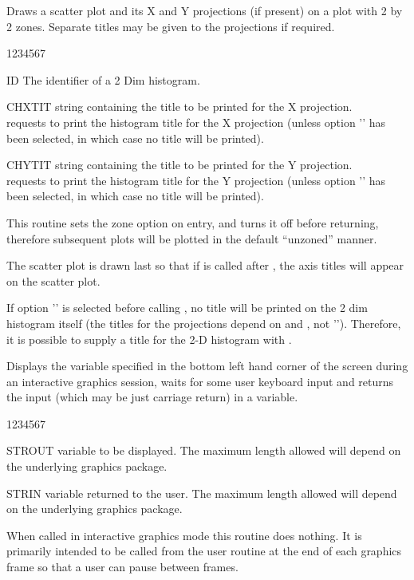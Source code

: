 \Action
Draws a scatter plot and its X and Y projections (if present) on a plot with 2 
by 2 zones. Separate titles may be given to the projections if required.
\Pdesc
\begin{DLtt}{1234567}
\item[ID]     The \HBOOK{} identifier of a 2 Dim histogram.
\item[CHXTIT] \CHARACTER{} string containing the title to be printed for the X 
              projection.\\
               requests to print the histogram title for the X 
              projection (unless option  '' has been selected, in 
              which case no title will be printed).
\item[CHYTIT] \CHARACTER{} string containing the title to be printed for the Y
              projection.\\
               requests to print the histogram title for the Y 
              projection (unless option  '' has been selected, in 
              which case no title will be printed).
\end{DLtt}
\Remarks
\begin{UL}
\item This routine sets the zone option on entry, and turns it off before 
      returning, therefore subsequent plots will be plotted in the default 
      ``unzoned'' manner.
\item The scatter plot is drawn last so that if  is called after 
      , the axis titles will appear on the scatter plot.
\item If option '' is selected before calling , no title
      will be printed on the 2 dim histogram itself (the titles for the 
      projections depend on  and , not '').
      Therefore, it is possible to supply a title for the 2-D histogram with
      .
\end{UL}


\Action
Displays the \CHARACTER{} variable specified in the bottom left hand corner of 
the screen during an interactive graphics session, waits for some user keyboard
input and returns the input (which may be just carriage return) in a
\CHARACTER{} variable.
\Pdesc
\begin{DLtt}{1234567}
\item[STROUT] \CHARACTER{} variable to be displayed. The maximum length allowed
              will depend on the underlying graphics package.
\item[STRIN]  \CHARACTER{} variable returned to the user. The maximum length 
              allowed will depend on the underlying graphics package.
\end{DLtt}
\Remark
When called in interactive graphics mode this routine does nothing. It is 
primarily intended to be called from the user routine  at the end 
of each graphics frame so that a user can pause between frames.

